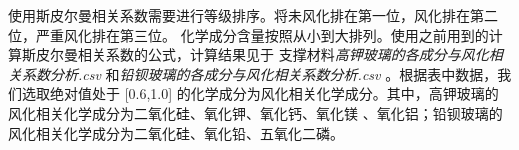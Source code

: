 \documentclass[withoutpreface,bwprint]{cumcmthesis} %
\begin{document}
使用斯皮尔曼相关系数需要进行等级排序。将未风化排在第一位，风化排在第二位，严重风化排在第三位。
化学成分含量按照从小到大排列。使用之前用到的计算斯皮尔曼相关系数的公式，计算结果见于
支撑材料\emph{高钾玻璃的各成分与风化相关系数分析.csv} 和\emph{铅钡玻璃的各成分与风化相关系数分析.csv}
。根据表中数据，我们选取绝对值处于 [0.6,1.0]
的化学成分为风化相关化学成分。其中，高钾玻璃的风化相关化学成分为二氧化硅、氧化钾、氧化钙、氧化镁
、氧化铝；铅钡玻璃的风化相关化学成分为二氧化硅、氧化铅、五氧化二磷。
\end{document}
